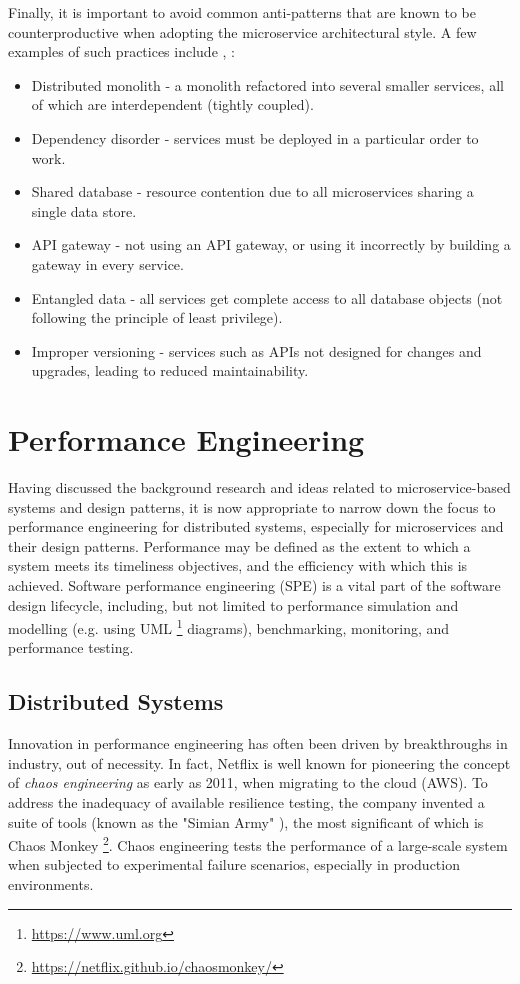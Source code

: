 Finally, it is important to avoid common anti-patterns that are known to be counterproductive when adopting the microservice architectural style. A few examples of such practices include \cite{alagarasan15}, \cite{kanjilal21}:

\begin{itemize}
  \item Distributed monolith - a monolith refactored into several smaller services, all of which are interdependent (tightly coupled).
  \item Dependency disorder - services must be deployed in a particular order to work.
  \item Shared database - resource contention due to all microservices sharing a single data store.
  \item API gateway - not using an API gateway, or using it incorrectly by building a gateway in every service.
  \item Entangled data - all services get complete access to all database objects (not following the principle of least privilege).
  \item Improper versioning - services such as APIs not designed for changes and upgrades, leading to reduced maintainability.
\end{itemize}

\section{Performance Engineering}

Having discussed the background research and ideas related to microservice-based systems and design patterns, it is now appropriate to narrow down the focus to performance engineering for distributed systems, especially for microservices and their design patterns. Performance may be defined as the extent to which a system meets its timeliness objectives, and the efficiency with which this is achieved. Software performance engineering (SPE) is a vital part of the software design lifecycle, including, but not limited to performance simulation and modelling (e.g. using UML \footnote{\url{https://www.uml.org}} diagrams), benchmarking, monitoring, and performance testing.

\subsection{Distributed Systems}

Innovation in performance engineering has often been driven by breakthroughs in industry, out of necessity. In fact, Netflix is well known for pioneering the concept of \textit{chaos engineering} as early as 2011, when migrating to the cloud (AWS). To address the inadequacy of available resilience testing, the company invented a suite of tools (known as the "Simian Army" \cite{netflix-chaos}), the most significant of which is Chaos Monkey \footnote{\url{https://netflix.github.io/chaosmonkey/}}. Chaos engineering tests the performance of a large-scale system when subjected to experimental failure scenarios, especially in production environments.

